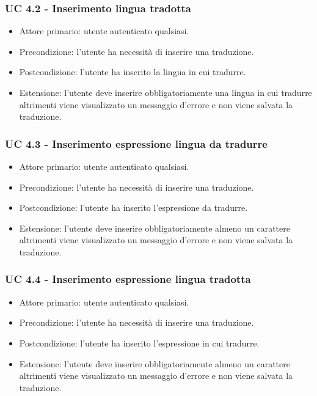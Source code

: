     \subsubsection{UC 4.2 - Inserimento lingua tradotta}
        \begin{itemize}
            \item Attore primario: utente autenticato qualsiasi.
            \item Precondizione: l'utente ha necessità di inserire una traduzione.
            \item Postcondizione: l'utente ha inserito la lingua in cui tradurre.
            \item Estensione: l'utente deve inserire obbligatoriamente una lingua in cui tradurre altrimenti viene visualizzato un messaggio d'errore e non viene salvata la traduzione.
        \end{itemize}
    \subsubsection{UC 4.3 - Inserimento espressione lingua da tradurre}
        \begin{itemize}
            \item Attore primario: utente autenticato qualsiasi.
            \item Precondizione: l'utente ha necessità di inserire una traduzione.
            \item Postcondizione: l'utente ha inserito l'espressione da tradurre.
            \item Estensione: l'utente deve inserire obbligatoriamente almeno un carattere altrimenti viene visualizzato un messaggio d'errore e non viene salvata la traduzione.
        \end{itemize}
    \subsubsection{UC 4.4 - Inserimento espressione lingua tradotta}
        \begin{itemize}
            \item Attore primario: utente autenticato qualsiasi.
            \item Precondizione: l'utente ha necessità di inserire una traduzione.
            \item Postcondizione: l'utente ha inserito l'espressione in cui tradurre.
            \item Estensione: l'utente deve inserire obbligatoriamente almeno un carattere altrimenti viene visualizzato un messaggio d'errore e non viene salvata la traduzione.
        \end{itemize}
